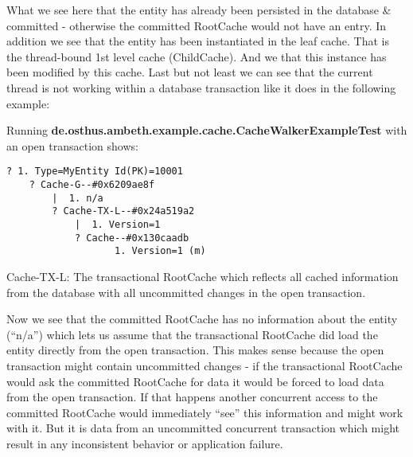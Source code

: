 What we see here that the entity has already been persisted in the database \& committed - otherwise the committed RootCache would not have an entry. In addition we see that the entity has been instantiated in the leaf cache. That is the thread-bound 1st level cache (ChildCache). And we that this instance has been modified by this cache. Last but not least we can see that the current thread is not working within a database transaction like it does in the following example:

Running \textbf{de.osthus.ambeth.example.cache.CacheWalkerExampleTest} with an open transaction shows:

\begin{lstlisting}[style=Bash]
? 1. Type=MyEntity Id(PK)=10001
	? Cache-G--#0x6209ae8f
		|  1. n/a
		? Cache-TX-L--#0x24a519a2
			|  1. Version=1
			? Cache--#0x130caadb
				   1. Version=1 (m)
\end{lstlisting}
Cache-TX-L: The transactional RootCache which reflects all cached information from the database with all uncommitted changes in the open transaction.

Now we see that the committed RootCache has no information about the entity (``n/a'') which lets us assume that the transactional RootCache did load the entity directly from the open transaction. This makes sense because the open transaction might contain uncommitted changes - if the transactional RootCache would ask the committed RootCache for data it would be forced to load data from the open transaction. If that happens another concurrent access to the committed RootCache would immediately ``see'' this information and might work with it. But it is data from an uncommitted concurrent transaction which might result in any inconsistent behavior or application failure.